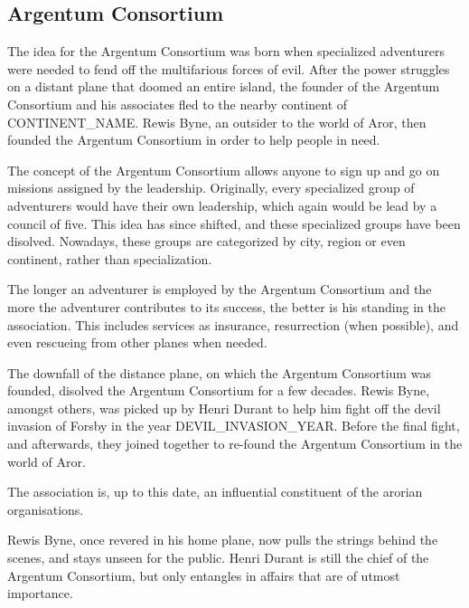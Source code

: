 \subsection{Argentum Consortium}
\label{sec:Argentum Consortium}

The idea for the Argentum Consortium was born when specialized adventurers were
needed to fend off the multifarious forces of evil. After the power struggles on
a distant plane that doomed an entire island, the founder of the Argentum
Consortium and his associates fled to the nearby continent of CONTINENT_NAME.
Rewis Byne, an outsider to the world of Aror, then founded the Argentum
Consortium in order to help people in need.

The concept of the Argentum Consortium allows anyone to sign up and go on
missions assigned by the leadership. Originally, every specialized group of
adventurers would have their own leadership, which again would be lead by a
council of five. This idea has since shifted, and these specialized groups have
been disolved. Nowadays, these groups are categorized by city, region or even
continent, rather than specialization.

The longer an adventurer is employed by the Argentum Consortium and the more the
adventurer contributes to its success, the better is his standing in the
association. This includes services as insurance, resurrection (when possible),
and even rescueing from other planes when needed.

The downfall of the distance plane, on which the Argentum Consortium was
founded, disolved the Argentum Consortium for a few decades. Rewis Byne, amongst
others, was picked up by Henri Durant to help him fight off the devil invasion
of Forsby in the year DEVIL_INVASION_YEAR. Before the final fight, and
afterwards, they joined together to re-found the Argentum Consortium in the
world of Aror.

The association is, up to this date, an influential constituent of the arorian
organisations.

Rewis Byne, once revered in his home plane, now pulls the strings behind the
scenes, and stays unseen for the public. Henri Durant is still the chief of the
Argentum Consortium, but only entangles in affairs that are of utmost
importance.
